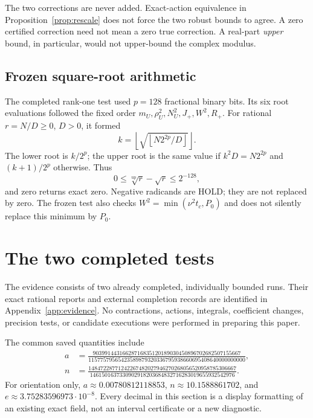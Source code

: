 \documentclass[11pt,a4paper]{article}
\newcommand{\hold}{\textsf{HOLD}}
\theoremstyle{definition}
\theoremstyle{remark}
\numberwithin{equation}{section}
\begin{document}
The two corrections are never added. Exact-action equivalence in
Proposition~\ref{prop:rescale} does not force the two robust bounds to
agree. A zero certified correction need not mean a zero true
correction. A real-part \emph{upper} bound, in particular, would not
upper-bound the complex modulus.

\subsection{Frozen square-root arithmetic}

The completed rank-one test used $p=128$ fractional binary bits.
Its six root evaluations followed the fixed order
$m_U,\rho_U^2,N_U^2,J_+,W^2,R_+$.
For rational $r=N/D\ge0$, $D>0$, it formed
\[
 k=\left\lfloor\sqrt{\left\lfloor N2^{2p}/D\right\rfloor}\right\rfloor.
\]
The lower root is $k/2^p$; the upper root is the same value if
$k^2D=N2^{2p}$ and $(k+1)/2^p$ otherwise. Thus
\begin{equation}\label{eq:rooterror}
 0\le\sqrt[\mathrm{up}]{r}-\sqrt r\le2^{-128},
\end{equation}
and zero returns exact zero. Negative radicands are \hold; they are
not replaced by zero. The frozen test also checks
$W^2=\min(\nu^2t_c,P_0)$ and does not silently replace this minimum
by $P_0$.

\section{The two completed tests}\label{sec:results}

The evidence consists of two already completed, individually bounded
runs. Their exact rational reports and external completion records are
identified in Appendix~\ref{app:evidence}. No contractions, actions,
integrals, coefficient changes, precision tests, or candidate executions
were performed in preparing this paper.

The common saved quantities include
\begin{align}
 a&=\frac{90399144316628716835120189030450896702682507155667}
 {11577579565423589879320336795938660695408640000000000},
                                                        \label{eq:saveda}\\
 n&=\frac{14847228771242267482027946270268056520958785306667}
 {1461501637330902918203684832716283019655932542976}.
                                                        \label{eq:savedn}
\end{align}
For orientation only, $a\approx0.00780812118853$,
$n\approx10.1588861702$, and $e\approx3.75283596973\cdot10^{-8}$.
Every decimal in this section is a display formatting of an existing
exact field, not an interval certificate or a new diagnostic.
\end{document}
